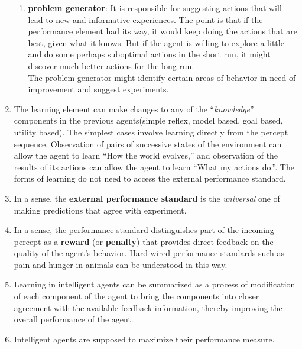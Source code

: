 \begin{enumerate}
\begin{enumerate}
        \item \textbf{problem generator}: It is responsible for suggesting actions that will lead to new and informative experiences. The point is that if the performance element had its way, it would keep doing the actions that are best, given what it knows. But if the agent is willing to explore a little and do some perhaps suboptimal actions in the short run, it might discover much better actions for the long run. 
        \hfill \cite{ai/book/Artificial-Intelligence-A-Modern-Approach/Russell-Norvig}
        \\
        The problem generator might identify certain areas of behavior in need of improvement and suggest experiments.
        \hfill \cite{ai/book/Artificial-Intelligence-A-Modern-Approach/Russell-Norvig}
         
    \end{enumerate}

    \item The learning element can make changes to any of the “\textit{knowledge}” components in the previous agents(simple reflex, model based, goal based, utility based). The simplest cases involve learning directly from the percept sequence. Observation of pairs of successive states of the environment can allow the agent to learn “How the world evolves,” and observation of the results of its actions can allow the agent to learn “What my actions do.”.
    The forms of learning do not need to access the external performance standard.
    \hfill \cite{ai/book/Artificial-Intelligence-A-Modern-Approach/Russell-Norvig}


    \item In a sense, the \textbf{external performance standard} is the \textit{universal} one of making predictions that agree with experiment.
    \hfill \cite{ai/book/Artificial-Intelligence-A-Modern-Approach/Russell-Norvig}

    \item  In a sense, the performance standard distinguishes part of the incoming percept as a \textbf{reward} (or \textbf{penalty}) that provides direct feedback on the quality of the agent’s behavior. Hard-wired performance standards such as pain and hunger in animals can be understood in this way.
    \hfill \cite{ai/book/Artificial-Intelligence-A-Modern-Approach/Russell-Norvig}

    \item Learning in intelligent agents can be summarized as a process of modification of each component of the agent to bring the components into closer agreement with the available feedback information, thereby improving the overall performance of the agent.
    \hfill \cite{ai/book/Artificial-Intelligence-A-Modern-Approach/Russell-Norvig}

    \item Intelligent agents are supposed to maximize their performance measure.
    \hfill \cite{ai/book/Artificial-Intelligence-A-Modern-Approach/Russell-Norvig}
\end{enumerate}


